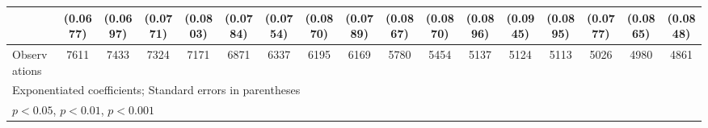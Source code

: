 {\begin{tabular}{l*{16}{c}}
                    &    (0.0677)         &    (0.0697)         &    (0.0771)         &    (0.0803)         &    (0.0784)         &    (0.0754)         &    (0.0870)         &    (0.0789)         &    (0.0867)         &    (0.0870)         &    (0.0896)         &    (0.0945)         &    (0.0895)         &    (0.0777)         &    (0.0865)         &    (0.0848)         \\
\hline
Observations        &        7611         &        7433         &        7324         &        7171         &        6871         &        6337         &        6195         &        6169         &        5780         &        5454         &        5137         &        5124         &        5113         &        5026         &        4980         &        4861         \\
\hline\hline
\multicolumn{17}{l}{\footnotesize Exponentiated coefficients; Standard errors in parentheses}\\
\multicolumn{17}{l}{\footnotesize \sym{*} \(p<0.05\), \sym{**} \(p<0.01\), \sym{***} \(p<0.001\)}\\
\end{tabular}
}
